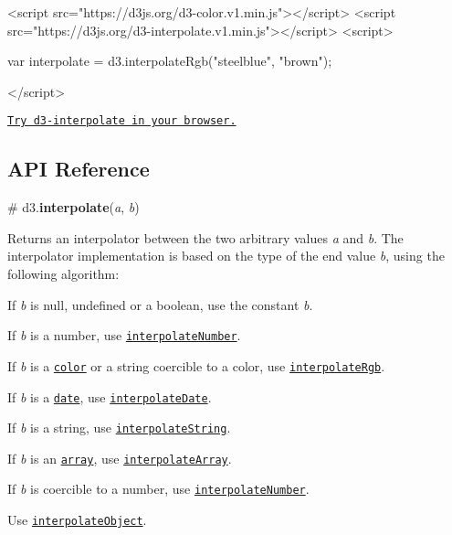 \begin{DoxyCode}
<script src="https://d3js.org/d3-color.v1.min.js"></script>
<script src="https://d3js.org/d3-interpolate.v1.min.js"></script>
<script>

var interpolate = d3.interpolateRgb("steelblue", "brown");

</script>
\end{DoxyCode}


\href{https://tonicdev.com/npm/d3-interpolate}{\tt Try d3-\/interpolate in your browser.}

\subsection*{A\+PI Reference}

\label{_interpolate}%
\# d3.{\bfseries interpolate}({\itshape a}, {\itshape b})

Returns an interpolator between the two arbitrary values {\itshape a} and {\itshape b}. The interpolator implementation is based on the type of the end value {\itshape b}, using the following algorithm\+:


\begin{DoxyEnumerate}
\item If {\itshape b} is null, undefined or a boolean, use the constant {\itshape b}.
\item If {\itshape b} is a number, use \href{#interpolateNumber}{\tt interpolate\+Number}.
\item If {\itshape b} is a \href{https://github.com/d3/d3-color#color}{\tt color} or a string coercible to a color, use \href{#interpolateRgb}{\tt interpolate\+Rgb}.
\item If {\itshape b} is a \href{https://developer.mozilla.org/en-US/docs/Web/JavaScript/Reference/Global_Objects/Date}{\tt date}, use \href{#interpolateDate}{\tt interpolate\+Date}.
\item If {\itshape b} is a string, use \href{#interpolateString}{\tt interpolate\+String}.
\item If {\itshape b} is an \href{https://developer.mozilla.org/en-US/docs/Web/JavaScript/Reference/Global_Objects/Array/isArray}{\tt array}, use \href{#interpolateArray}{\tt interpolate\+Array}.
\item If {\itshape b} is coercible to a number, use \href{#interpolateNumber}{\tt interpolate\+Number}.
\item Use \href{#interpolateObject}{\tt interpolate\+Object}.
\end{DoxyEnumerate}

